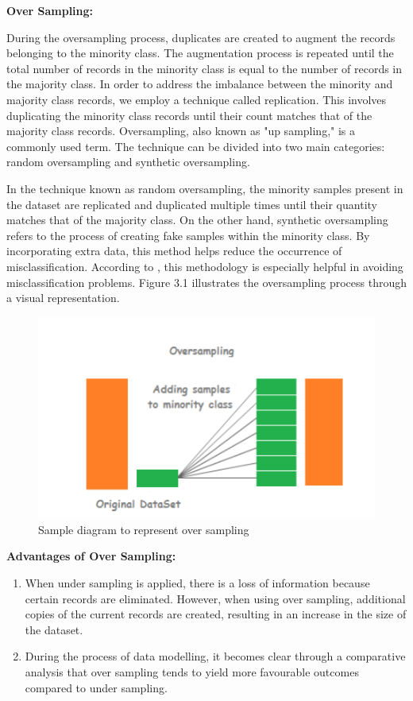 \textbf{Over Sampling:}




During the oversampling process, duplicates are created to augment the records belonging to the minority class. The augmentation process is repeated until the total number of records in the minority class is equal to the number of records in the majority class. In order to address the imbalance between the minority and majority class records, we employ a technique called replication. This involves duplicating the minority class records until their count matches that of the majority class records. Oversampling, also known as "up sampling," is a commonly used term. The technique can be divided into two main categories: random oversampling and synthetic oversampling.

In the technique known as random oversampling, the minority samples present in the dataset are replicated and duplicated multiple times until their quantity matches that of the majority class. On the other hand, synthetic oversampling refers to the process of creating fake samples within the minority class. By incorporating extra data, this method helps reduce the occurrence of misclassification. According to \cite{Mohammed}, this methodology is especially helpful in avoiding misclassification problems. Figure 3.1 \cite{Mohammed} illustrates the oversampling process through a visual representation.
\begin{figure}[ht]
\centerline{\includegraphics[width=1\textwidth]{figure4.png}}
	\centering
	\caption{Sample diagram to represent over sampling}
	\label{over sampling}
\end{figure}

\textbf{Advantages of Over Sampling:}

\begin{enumerate}
	\item When under sampling is applied, there is a loss of information because certain records are eliminated. However, when using over sampling, additional copies of the current records are created, resulting in an increase in the size of the dataset.
	\item During the process of data modelling, it becomes clear through a comparative analysis that over sampling tends to yield more favourable outcomes compared to under sampling.
\end{enumerate}



